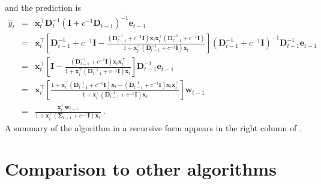 and the prediction is
\begin{eqnarray*}
\hat{y}_{t} & = & \mathbf{x}_{t}^{\top}\mathbf{D}_{t}^{-1}\left(\mathbf{I}+c^{-1}\mathbf{D}_{t-1}\right)^{-1}\mathbf{e}_{t-1}\\
 & = & \mathbf{x}_{t}^{\top}\left[\mathbf{D}_{t-1}^{-1}+c^{-1}\mathbf{I}-\frac{\left(\mathbf{D}_{t-1}^{-1}+c^{-1}\mathbf{I}\right)\mathbf{x}_{t}\mathbf{x}_{t}^{\top}\left(\mathbf{D}_{t-1}^{-1}+c^{-1}\mathbf{I}\right)}{1+\mathbf{x}_{t}^{\top}\left(\mathbf{D}_{t-1}^{-1}+c^{-1}\mathbf{I}\right)\mathbf{x}_{t}}\right]\left(\mathbf{D}_{t-1}^{-1}+c^{-1}\mathbf{I}\right)^{-1}\mathbf{D}_{t-1}^{-1}\mathbf{e}_{t-1}\\
 & = & \mathbf{x}_{t}^{\top}\left[\mathbf{I}-\frac{\left(\mathbf{D}_{t-1}^{-1}+c^{-1}\mathbf{I}\right)\mathbf{x}_{t}\mathbf{x}_{t}^{\top}}{1+\mathbf{x}_{t}^{\top}\left(\mathbf{D}_{t-1}^{-1}+c^{-1}\mathbf{I}\right)\mathbf{x}_{t}}\right]\mathbf{D}_{t-1}^{-1}\mathbf{e}_{t-1}\\
 & = & \mathbf{x}_{t}^{\top}\left[\frac{1+\mathbf{x}_{t}^{\top}\left(\mathbf{D}_{t-1}^{-1}+c^{-1}\mathbf{I}\right)\mathbf{x}_{t}-\left(\mathbf{D}_{t-1}^{-1}+c^{-1}\mathbf{I}\right)\mathbf{x}_{t}\mathbf{x}_{t}^{\top}}{1+\mathbf{x}_{t}^{\top}\left(\mathbf{D}_{t-1}^{-1}+c^{-1}\mathbf{I}\right)\mathbf{x}_{t}}\right]\mathbf{w}_{t-1}\\
 & = & \frac{\mathbf{x}_{t}^{\top}\mathbf{w}_{t-1}}{1+\mathbf{x}_{t}^{\top}\left(\mathbf{\Sigma}_{t-1}+c^{-1}\mathbf{I}\right)\mathbf{x}_{t}}
 ~.
\end{eqnarray*}
A summary of the algorithm in a recursive form appears in the right column of .


\section{Comparison to other algorithms}
\label{sec:LASER_comparison}

